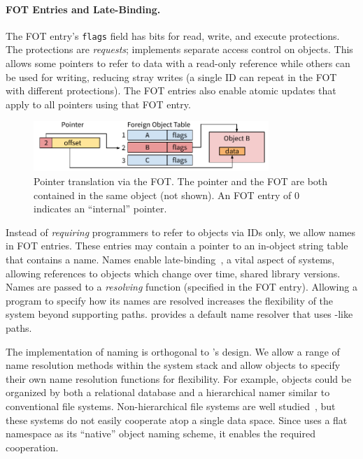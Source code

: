 {    \paragraph{FOT Entries and Late-Binding.}

    The FOT entry's \texttt{flags} field has bits for read, write, and execute protections. The
    protections are \textit{requests}; \Twizzler implements separate access control on objects.
    This allows some pointers to refer to data with a read-only reference while others can be used for
    writing, reducing stray writes (a single ID can repeat in the FOT with different protections).
    The FOT entries also enable atomic updates that apply to all pointers using
    that FOT entry.

    \begin{figure}[tb]
        \includegraphics[width=3.5in]{fig/ptrfot}
        \caption{Pointer translation via the FOT\@.
            The pointer and the FOT
            are both contained in the same object (not shown). An FOT entry of $0$ indicates an ``internal''
            pointer.
        }
        \label{fig:fottran}
    \end{figure}

    Instead of \emph{requiring} programmers to refer to objects via IDs only, we allow
    names in FOT entries. These entries may contain a pointer to an
    in-object string table that contains a name.
    Names enable late-binding~\cite{daley:cacm68}, a
    vital aspect of systems, allowing references to objects which change over time, \eg shared library versions.
    Names are passed to a \textit{resolving} function (specified in the FOT entry).
    Allowing a program to specify how its names are resolved
    increases the flexibility of the system beyond supporting \unix paths. \Twizzler
    provides a default name resolver that uses \unix-like paths.%

    The implementation of naming is orthogonal to \Twizzler's design. We
    allow a range of name resolution methods within the system stack
    and allow objects to specify their own name resolution functions for flexibility. For example,
    objects could be organized by both a relational database and a hierarchical namer
    similar to conventional file systems. Non-hierarchical file systems
    are well studied~\cite{gifford:sosp91, ames:mss06, padioleau:usenix03, gopal:osdi99,
        parkerwood:systor14}, but these systems do not easily cooperate atop a single data space.
    Since \Twizzler uses a flat namespace as its ``native'' object naming scheme, it
    enables the required cooperation.

}


